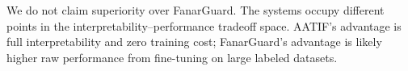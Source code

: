 \documentclass[11pt]{article}
\begin{document}
We do not claim superiority over FanarGuard.
The systems occupy different points in the interpretability--performance tradeoff space.
AATIF's advantage is full interpretability and zero training cost; FanarGuard's advantage is likely higher raw performance from fine-tuning on large labeled datasets.
\end{document}
